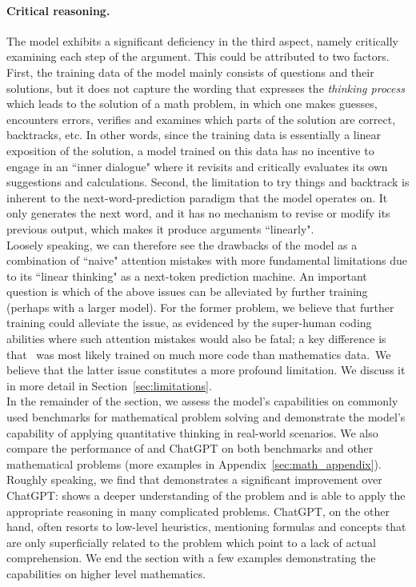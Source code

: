 \paragraph{Critical reasoning.} The model exhibits a significant deficiency in the third aspect, namely critically examining each step of the argument. This could be attributed to two factors. First, the training data of the model mainly consists of questions and their solutions, but it does not capture the wording that expresses the \emph{thinking process} which leads to the solution of a math problem, in which one makes guesses, encounters errors, verifies and examines which parts of the solution are correct, backtracks, etc. In other words, since the training data is essentially a linear exposition of the solution, a model trained on this data has no incentive to engage in an ``inner dialogue" where it revisits and critically evaluates its own suggestions and calculations. Second, the limitation to try things and backtrack is inherent to the next-word-prediction paradigm that the model operates on. It only generates the next word, and it has no mechanism to revise or modify its previous output, which makes it produce arguments ``linearly". \\



Loosely speaking, we can therefore see the drawbacks of the model as a combination of ``naive" attention mistakes with more fundamental limitations due to its ``linear thinking" as a next-token prediction machine. An important question is which of the above issues can be alleviated by further training (perhaps with a larger model). For the former problem, we believe that further training could alleviate the issue, as evidenced by the super-human coding abilities where such attention mistakes would also be fatal; a key difference is that \DV\ was most likely trained on much more code than mathematics data. We believe that the latter issue constitutes a more profound limitation. We discuss it in more detail in Section~\ref{sec:limitations}. \\

In the remainder of the section, we assess the model's capabilities on commonly used benchmarks for mathematical problem solving and demonstrate the model's capability of applying quantitative thinking in real-world scenarios. We also compare the performance of {\DV} and ChatGPT on both benchmarks and other mathematical problems (more examples in Appendix~\ref{sec:math_appendix}). Roughly speaking, we find that {\DV} demonstrates a significant improvement over ChatGPT: {\DV} shows a deeper understanding of the problem and is able to apply the appropriate reasoning in many complicated problems. ChatGPT, on the other hand, often resorts to low-level heuristics, mentioning formulas and concepts that are only superficially related to the problem which point to a lack of actual comprehension. We end the section with a few examples demonstrating the capabilities on higher level mathematics.






